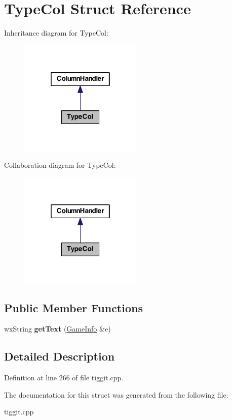 \hypertarget{struct_type_col}{\section{Type\-Col Struct Reference}
\label{struct_type_col}
}


Inheritance diagram for Type\-Col\-:
\nopagebreak
\begin{figure}[H]
\begin{center}
\leavevmode
\includegraphics[width=166pt]{struct_type_col__inherit__graph}
\end{center}
\end{figure}


Collaboration diagram for Type\-Col\-:
\nopagebreak
\begin{figure}[H]
\begin{center}
\leavevmode
\includegraphics[width=166pt]{struct_type_col__coll__graph}
\end{center}
\end{figure}
\subsection*{Public Member Functions}
\begin{DoxyCompactItemize}
\item 
\hypertarget{struct_type_col_a94ca8f67b5da32f95950fb90e38fcebc}{wx\-String {\bfseries get\-Text} (\hyperlink{struct_game_info}{Game\-Info} \&e)}\label{struct_type_col_a94ca8f67b5da32f95950fb90e38fcebc}

\end{DoxyCompactItemize}


\subsection{Detailed Description}


Definition at line 266 of file tiggit.\-cpp.



The documentation for this struct was generated from the following file\-:\begin{DoxyCompactItemize}
\item 
tiggit.\-cpp\end{DoxyCompactItemize}
